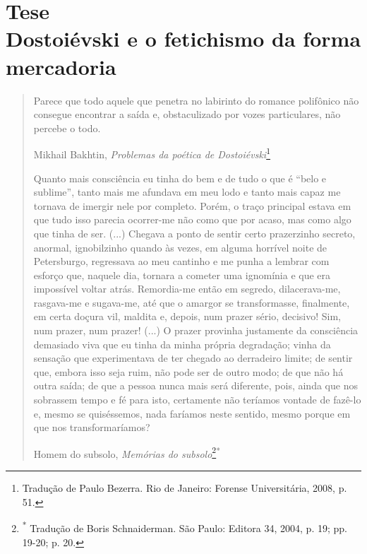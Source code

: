 \part[Parte I -- Tese]
{Tese\\[\bigskipamount] 
      \large Dostoiévski e o fetichismo da forma mercadoria}


\begin{quote}
Parece que todo aquele que penetra no labirinto do romance polifônico
não consegue encontrar a saída e, obstaculizado por vozes particulares,
não percebe o todo.

Mikhail Bakhtin, \emph{Problemas da poética de Dostoiévski}\footnote{Tradução
  de Paulo Bezerra. Rio de Janeiro: Forense Universitária, 2008, p. 51.}

Quanto mais consciência eu tinha do bem e de tudo o que é ``belo e
sublime'', tanto mais me afundava em meu lodo e tanto mais capaz me
tornava de imergir nele por completo. Porém, o traço principal estava em
que tudo isso parecia ocorrer-me não como que por acaso, mas como algo
que tinha de ser. (...) Chegava a ponto de sentir certo prazerzinho
secreto, anormal, ignobilzinho quando às vezes, em alguma horrível noite
de Petersburgo, regressava ao meu cantinho e me punha a lembrar com
esforço que, naquele dia, tornara a cometer uma ignomínia e que era
impossível voltar atrás. Remordia-me então em segredo, dilacerava-me,
rasgava-me e sugava-me, até que o amargor se transformasse, finalmente,
em certa doçura vil, maldita e, depois, num prazer sério, decisivo! Sim,
num prazer, num prazer! (...) O prazer provinha justamente da
consciência demasiado viva que eu tinha da minha própria degradação;
vinha da sensação que experimentava de ter chegado ao derradeiro limite;
de sentir que, embora isso seja ruim, não pode ser de outro modo; de que
não há outra saída; de que a pessoa nunca mais será diferente, pois,
ainda que nos sobrassem tempo e fé para isto, certamente não teríamos
vontade de fazê-lo e, mesmo se quiséssemos, nada faríamos neste sentido,
mesmo porque em que nos transformaríamos?

Homem do subsolo, \emph{Memórias do subsolo}\footnote{\textsuperscript{*}
  Tradução de Boris Schnaiderman. São Paulo: Editora 34, 2004, p. 19;
  pp. 19-20; p. 20.}\textsuperscript{*}
\end{quote}

